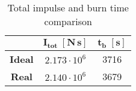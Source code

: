 \begin{table}[H]
    \renewcommand{\arraystretch}{1.25}
    \centering
    \begin{tabular}{|c|c|c|}
        \hline
        & $\boldsymbol{I_{tot} \; [\textbf{N} \, \textbf{s}]}$ & $\boldsymbol{t_b \; [\textbf{s}]}$ \\
        \hline
        \hline
        \textbf{Ideal} & $2.173 \cdot 10^6$ & 3716 \\
        \hline
        \textbf{Real} & $2.140 \cdot 10^6$ & 3679 \\
        \hline
    \end{tabular}
    \caption{Total impulse and burn time comparison}
    \label{table:I_tot_t_b_comp}
\end{table}